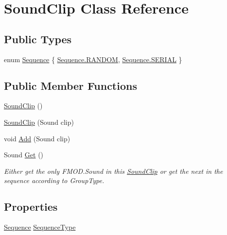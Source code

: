 \hypertarget{class_sound_clip}{}\section{Sound\+Clip Class Reference}
\label{class_sound_clip}
\subsection*{Public Types}
\begin{DoxyCompactItemize}
\item 
enum \hyperlink{class_sound_clip_a81daec2536e567316099f0e16adefb79}{Sequence} \{ \hyperlink{class_sound_clip_a81daec2536e567316099f0e16adefb79a170e02e86972c2be8559884cc3c12254}{Sequence.\+R\+A\+N\+D\+OM}, 
\hyperlink{class_sound_clip_a81daec2536e567316099f0e16adefb79a7b804a28d6154ab8007287532037f1d0}{Sequence.\+S\+E\+R\+I\+AL}
 \}
\end{DoxyCompactItemize}
\subsection*{Public Member Functions}
\begin{DoxyCompactItemize}
\item 
\hyperlink{class_sound_clip_a408f3733c2debc799fff663d545a53a6}{Sound\+Clip} ()
\item 
\hyperlink{class_sound_clip_a4f53d33b816b630b6dcf9f3aa2704f86}{Sound\+Clip} (Sound clip)
\item 
void \hyperlink{class_sound_clip_a52131a7c0ce75a4735b8fe7806b330c9}{Add} (Sound clip)
\item 
Sound \hyperlink{class_sound_clip_af6035e81f4d6a3a72d85109f4537a15d}{Get} ()
\begin{DoxyCompactList}\small\item\em Either get the only F\+M\+O\+D.\+Sound in this \hyperlink{class_sound_clip}{Sound\+Clip} or get the next in the sequence according to Group\+Type. \end{DoxyCompactList}\end{DoxyCompactItemize}
\subsection*{Properties}
\begin{DoxyCompactItemize}
\item 
\hyperlink{class_sound_clip_a81daec2536e567316099f0e16adefb79}{Sequence} \hyperlink{class_sound_clip_aead0e9776d9167de7b11194c3d7e3654}{Sequence\+Type}
\end{DoxyCompactItemize}


